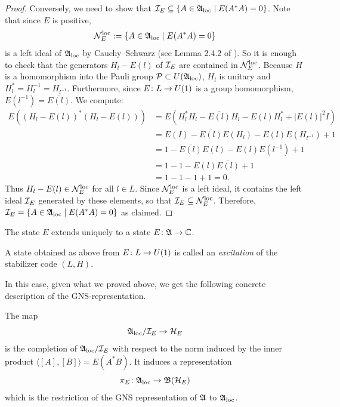 \documentclass[11pt]{amsart}
\begin{document}
\begin{proof}
Conversely, we need to show that $\mathcal{I}_E \subseteq \{ A \in \mathfrak{A}_{\mathrm{loc}} \mid E(A^*A) = 0 \}$. Note that since $E$ is positive,
\[  \mathcal{N}_E^{\mathrm{loc}}:= \{ A \in \mathfrak{A}_{\mathrm{loc}} \mid E(A^*A) = 0 \}\]
is a left ideal of $\mathfrak{A}_{\mathrm{loc}}$ by Cauchy--Schwarz (see Lemma 2.4.2 of \cite{Naa17}). So it is enough to check that the generators $H_l - E(l)$ of $\mathcal{I}_E$ are contained in $ \mathcal{N}_E^{\mathrm{loc}}$. Because $H$ is a homomorphism into the Pauli group $\mathcal{P} \subset U(\mathfrak{A}_{\mathrm{loc}})$, $H_l$ is unitary and $H_l^* = H_l^{-1} = H_{l^{-1}}$. Furthermore, since $E \colon L \to U(1)$ is a group homomorphism, $E(l^{-1}) = \overline{E(l)}$. We compute:
\begin{align*}
E((H_l - E(l))^*(H_l - E(l))) &= E(H_l^*H_l - \overline{E(l)}H_l - E(l)H_l^* + |E(l)|^2 I) \\
&= E(I) - \overline{E(l)}E(H_l) - E(l)E(H_{l^{-1}}) + 1 \\
&= 1 - \overline{E(l)}E(l) - E(l)E(l^{-1}) + 1 \\
&= 1 - 1 - E(l)\overline{E(l)} + 1 \\
&= 1 - 1 - 1 + 1 = 0.
\end{align*}
Thus $H_l - E(l) \in \mathcal{N}_E^{\mathrm{loc}}$ for all $l \in L$. Since $\mathcal{N}_E^{\mathrm{loc}}$ is a left ideal, it contains the left ideal $\mathcal{I}_E$ generated by these elements, so that $\mathcal{I}_E \subseteq  \mathcal{N}_E^{\mathrm{loc}}$.
Therefore,  $\mathcal{I}_E = \{ A \in \mathfrak{A}_{\mathrm{loc}} \mid E(A^*A) = 0 \}$ as claimed.
\end{proof}

\begin{cor}
The state $E$ extends uniquely to a state $E \colon \mathfrak{A}\to \mathbb{C}$.
\end{cor}

\begin{defn}
A state obtained as above from $E \colon L \to U(1)$ is called an \emph{excitation} of the stabilizer code $(L,H)$.
\end{defn}

In this case, given what we proved above, we get the following concrete description of the GNS-representation.
\begin{prop}
The map
\[\mathfrak{A}_{\mathrm{loc}}/\mathcal{I}_E \to \mathcal{H}_E\]
is the completion of $\mathfrak{A}_{\mathrm{loc}}/\mathcal{I}_E$ with respect to the norm induced by the inner product $\langle [A], [B]\rangle = E(A^*B)$. It
induces a representation
\[\pi_E \colon \mathfrak{A}_{\mathrm{loc}} \to \mathfrak{B}(\mathcal{H}_E)\]
which is the restriction of the GNS representation of $\mathfrak{A}$ to $\mathfrak{A}_{\mathrm{loc}}$.
\end{prop} 
\end{document}

